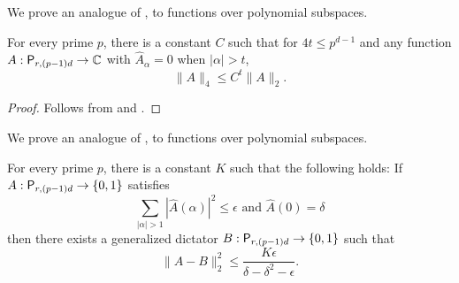 We prove an analogue of , to functions over polynomial
subspaces. 

\begin{lemma}
\label{thm:hyp-for-poly} For every prime $p$, 
there is a constant $C$ such that for $4t\leq p^{d-1}$
and any function $A:\mathsf P_{r,(p-1)d} \rightarrow \mathbb C$ with $\widehat A_\alpha = 0$ when
$|\alpha| > t$, $$\|A\|_4 \leq C^t \|A\|_2.$$ 
\end{lemma} 
\begin{proof} Follows
from  and . 
\end{proof}

We prove an analogue of , to functions over polynomial
subspaces. 
\begin{lemma} \label{thm:derand-dict} 
For every prime $p$, there is a constant $K$ such
that the following holds: If $A:\mathsf P_{r,(p-1)d} \rightarrow \{0,1\}$ satisfies
$$\sum_{|\alpha| > 1} |\widehat A(\alpha)|^2 \leq \epsilon \text{ and } \widehat
A(0) =\delta$$ 
then there exists a generalized dictator $B:\mathsf P_{r,(p-1)d} \rightarrow \{0,1\}$
such that 
$$\|A-B\|^2_2 \leq \frac{K\epsilon}{\delta -\delta^2-\epsilon}.$$
\end{lemma} 
